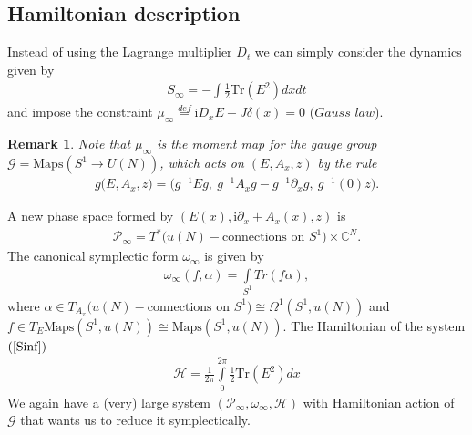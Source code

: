 \documentclass[12pt]{article}
\newtheorem{rem}{Remark}[section]
\numberwithin{equation}{section}
\theoremstyle{definition}
\newcommand {\ii} {\mathrm{i}}
\begin{document}
\subsection{Hamiltonian description}
Instead of using the Lagrange multiplier $D_{t}$ we can simply consider the dynamics given by
\begin{align}\label{Sinf}
    S_{\infty} = - \int \frac{1}{2} \mathrm{Tr} ( E^2 ) dx dt
\end{align}
and impose the constraint $\mu_{\infty} \overset{def}{=} {\ii}D_x E - J \delta(x) = 0$ ($\textit{Gauss law}$).
\begin{rem}\normalfont
Note that $\mu_{\infty}$ is the moment map for the gauge group $\mathcal{G} = \mathrm{Maps}(S^1 \rightarrow U(N))$, which acts on $(E, A_{x}, z)$ by the rule
\begin{align*}
    g\big(E, A_x, z \big) = \big( g^{-1} E g,~ g^{-1} A_x g - g^{-1} \partial_x g , ~g^{-1}(0) z \big).
\end{align*}
\end{rem}
A new phase space formed by $(E(x), {\ii}\partial_{x} + A_{x} (x), z)$ is
\begin{align*}
    \mathcal{P}_{\infty} = T^{*} \big( u(N)-\text{connections on }S^1 \big) \times \mathbb{C}^{N}.
\end{align*}
The canonical symplectic form $\omega_{\infty}$ is given by
\begin{align*}
    \omega_{\infty}(f, \alpha) = \int\limits_{S^{1}} Tr(f \alpha ),
\end{align*}
where $\alpha \in T_{A_{x}}\big( u(N)-\text{connections on }S^{1} \big) \cong \Omega^{1}(S^{1}, u(N))$ and $f \in T_{E}\mathrm{Maps}(S^{1}, u(N)) \cong \mathrm{Maps}(S^{1}, u(N))$.
The Hamiltonian of the system $(\ref{Sinf})$
\begin{align*}
    \mathcal{H} = \frac{1}{2\pi} \int \limits_{0}^{2\pi} \frac{1}{2} \mathrm{Tr} (E^2) dx
\end{align*}
We again have a (very) large system $(\mathcal{P}_{\infty}, \omega_{\infty}, \mathcal{H})$ with Hamiltonian action of $\mathcal{G}$ that wants us to reduce it symplectically.
\end{document}
